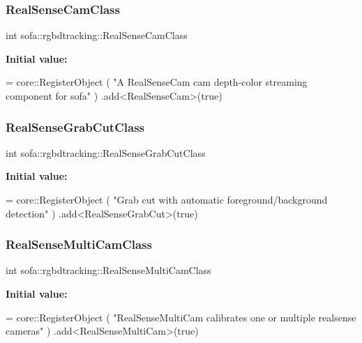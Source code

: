 \subsubsection{\texorpdfstring{Real\+Sense\+Cam\+Class}{RealSenseCamClass}}
{\footnotesize\ttfamily int sofa\+::rgbdtracking\+::\+Real\+Sense\+Cam\+Class}

{\bfseries Initial value\+:}
\begin{DoxyCode}
= core::RegisterObject ( \textcolor{stringliteral}{"A RealSenseCam cam depth-color streaming component for sofa"} )
        .add<RealSenseCam>(\textcolor{keyword}{true})
\end{DoxyCode}
\mbox{\label{namespacesofa_1_1rgbdtracking_ac0fc03382c0bfe23d9d73d844ce7ee91}} 
\subsubsection{\texorpdfstring{Real\+Sense\+Grab\+Cut\+Class}{RealSenseGrabCutClass}}
{\footnotesize\ttfamily int sofa\+::rgbdtracking\+::\+Real\+Sense\+Grab\+Cut\+Class}

{\bfseries Initial value\+:}
\begin{DoxyCode}
= core::RegisterObject ( \textcolor{stringliteral}{"Grab cut with automatic foreground/background detection"} )
.add<RealSenseGrabCut>(\textcolor{keyword}{true})
\end{DoxyCode}
\mbox{\label{namespacesofa_1_1rgbdtracking_a5f7b935ae843053a8c1c4aec898c37fb}} 
\subsubsection{\texorpdfstring{Real\+Sense\+Multi\+Cam\+Class}{RealSenseMultiCamClass}}
{\footnotesize\ttfamily int sofa\+::rgbdtracking\+::\+Real\+Sense\+Multi\+Cam\+Class}

{\bfseries Initial value\+:}
\begin{DoxyCode}
= core::RegisterObject ( \textcolor{stringliteral}{"RealSenseMultiCam calibrates one or multiple realsense cameras"} )
    .add<RealSenseMultiCam>(\textcolor{keyword}{true})
\end{DoxyCode}
\mbox{\label{namespacesofa_1_1rgbdtracking_a30f0b3b59f71c94fac5ceebea2f6cf4b}} 
